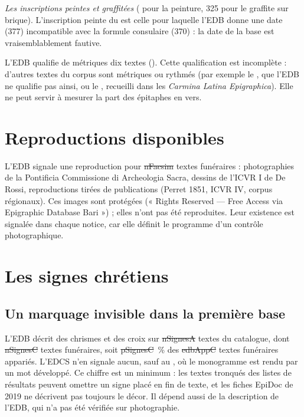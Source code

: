 \emph{Les inscriptions peintes et graffitées} ( pour la peinture, 325 pour le graffite sur brique). L’inscription peinte du  est celle pour laquelle l’EDB donne une date (377) incompatible avec la formule consulaire (370) : la date de la base est vraisemblablement fautive.

L’EDB qualifie de métriques dix textes (). Cette qualification est incomplète : d’autres textes du corpus sont métriques ou rythmés (par exemple le , que l’EDB ne qualifie pas ainsi, ou le , recueilli dans les \emph{Carmina Latina Epigraphica}). Elle ne peut servir à mesurer la part des épitaphes en vers.

\section{Reproductions disponibles}

L’EDB signale une reproduction pour \st{nFacsim} textes funéraires : photographies de la Pontificia Commissione di Archeologia Sacra, dessins de l’ICVR I de De Rossi, reproductions tirées de publications (Perret 1851, ICVR IV, corpus régionaux). Ces images sont protégées (« Rights Reserved — Free Access via Epigraphic Database Bari ») ; elles n’ont pas été reproduites. Leur existence est signalée dans chaque notice, car elle définit le programme d’un contrôle photographique.

\section{Les signes chrétiens}

\subsection{Un marquage invisible dans la première base}

L’EDB décrit des chrismes et des croix sur \st{nSignesA} textes du catalogue, dont \st{nSignesC} textes funéraires, soit \st{pSignesC}~\% des \st{edbAppC} textes funéraires appariés. L’EDCS n’en signale aucun, sauf au , où le monogramme est rendu par un mot développé. Ce chiffre est un minimum : les textes tronqués des listes de résultats peuvent omettre un signe placé en fin de texte, et les fiches EpiDoc de 2019 ne décrivent pas toujours le décor. Il dépend aussi de la description de l’EDB, qui n’a pas été vérifiée sur photographie.

